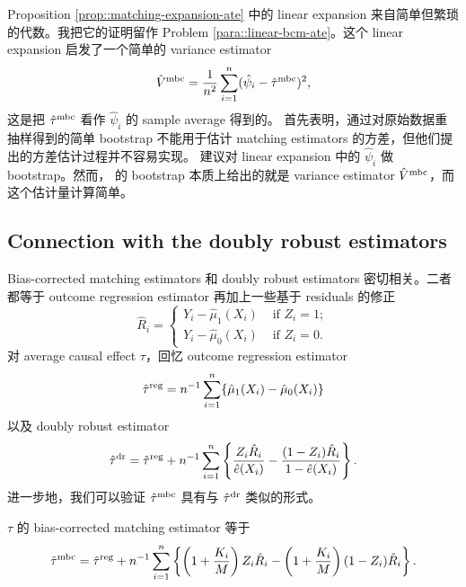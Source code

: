  
 
Proposition  \ref{prop::matching-expansion-ate} 中的 linear expansion 来自简单但繁琐的代数。我把它的证明留作 Problem \ref{para::linear-bcm-ate}。这个 linear expansion 启发了一个简单的 variance estimator
$$
\hat{V}^\textup{mbc}  = \frac{1}{n^2} \sum_{i=1}^n (  \hat{\psi}_i - \hat{\tau}^\textup{mbc}  )^2,
$$
这是把 $\hat{\tau}^\textup{mbc}  $ 看作 $  \hat{\psi}_i $ 的 sample average 得到的。\citet{abadie2008failure} 首先表明，通过对原始数据重抽样得到的简单 bootstrap 不能用于估计 matching estimators 的方差，但他们提出的方差估计过程并不容易实现。\citet{otsu2017bootstrap} 建议对 linear expansion 中的 $  \hat{\psi}_i $ 做 bootstrap。然而，\citet{otsu2017bootstrap} 的 bootstrap 本质上给出的就是 variance estimator $\hat{V}^\textup{mbc}  $，而这个估计量计算简单。


 
\subsection{Connection with the doubly robust estimators}
 \label{sec::connection-dr-att}
 
Bias-corrected matching estimators 和 doubly robust estimators 密切相关。二者都等于 outcome regression estimator
再加上一些基于 residuals 的修正
$$ 
 \hat{R}_i = 
 \begin{cases}
 Y_i - \hat{\mu}_1(X_i)  & \text{ if } Z_i=1;\\
 Y_i - \hat{\mu}_0(X_i)    & \text{ if } Z_i=0.
\end{cases} 
 $$
  对 average causal effect $\tau$，回忆 outcome regression estimator
$$
\hat{\tau}^{\textup{reg}} =  n^{-1} \sum_{i=1}^n \{ \hat{\mu}_1(X_i) -  \hat{\mu}_0(X_i)\} 
$$
以及 doubly robust estimator
$$
\hat{\tau}^\textup{dr}  =  \hat{\tau}^{\textup{reg}} 
+ n^{-1} \sum_{i=1}^n \left\{  \frac{Z_i \hat{R}_i }{ \hat{e}(X_i)} -  \frac{ (1-Z_i) \hat{R}_i}{ 1-  \hat{e}(X_i) } \right\} .
$$
进一步地，我们可以验证 $\hat{\tau}^\textup{mbc} $ 具有与 $\hat{\tau}^\textup{dr}  $ 类似的形式。
\begin{proposition}
\label{prop::mbc-dr}
$\tau$ 的 bias-corrected matching estimator 等于
$$
\hat{\tau}^\textup{mbc}   =\hat{\tau}^{\textup{reg}} 
+ n^{-1} \sum_{i=1}^n \left\{ \left(1+{ K_i\over M} \right)  Z_i \hat{R}_i  - \left( 1+{ K_i\over M} \right) (1-Z_i)  \hat{R}_i \right\} .
$$
\end{proposition}

